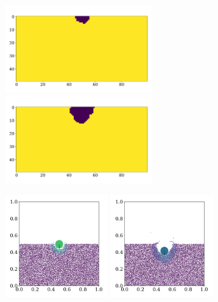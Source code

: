 \documentclass{article}
\begin{document}
    \begin{figure}[H]
        \centering
        \begin{subfigure}{.4\textwidth}                    
            \includegraphics[width=0.7\textwidth]{../plots/problem4/crater1.pdf}
            \includegraphics[width=0.7\textwidth]{../plots/problem4/crater9.pdf}
        \end{subfigure}
        \begin{subfigure}{.59\textwidth}                    
            \includegraphics[width=0.49\textwidth]{../plots/problem4/particles1.pdf}
            \includegraphics[width=0.49\textwidth]{../plots/problem4/particles9.pdf}

\end{subfigure}
\end{figure}
\end{document}
